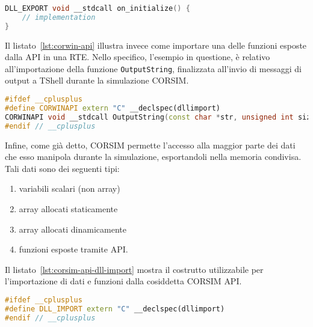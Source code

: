 \vspace*{8pt}\begin{lstlisting}[language=cpp, caption=Esempio di funzione \acs{RTE} esportata, label=lst:callpoint-impl]
DLL_EXPORT void __stdcall on_initialize() {
    // implementation
}
\end{lstlisting}

Il listato~\ref{lst:corwin-api} illustra invece come importare una delle funzioni esposte dalla  \acs{API} in una \acs{RTE}. Nello specifico, l'esempio in questione, è relativo all'importazione della funzione \lstinline[]|OutputString|, finalizzata all'invio di messaggi di output a \acs{TShell} durante la simulazione \acs{CORSIM}.
\vspace*{8pt}\begin{lstlisting}[language=cpp, caption=Importazione delle \acsfont{CORWIN} \acs{API}, label=lst:corwin-api]
#ifdef __cplusplus
#define CORWINAPI extern "C" __declspec(dllimport)
CORWINAPI void __stdcall OutputString(const char *str, unsigned int size, int msgCode, unsigned long color);
#endif // __cplusplus
\end{lstlisting}

Infine, come già detto, \acs{CORSIM} permette l'accesso alla maggior parte dei dati che esso manipola durante la simulazione, esportandoli nella memoria condivisa. Tali dati sono dei seguenti tipi:
\begin{enumerate}
    \item variabili scalari (non array)
    \item array allocati staticamente
    \item array allocati dinamicamente
    \item funzioni esposte tramite \acs{API}.
\end{enumerate}

Il listato~\ref{lst:corsim-api-dll-import} mostra il costrutto utilizzabile per l'importazione di dati e funzioni dalla cosiddetta \acs{CORSIM} \acs{API}.
\vspace*{8pt}\begin{lstlisting}[language=cpp, caption=Costrutto per l'importazione delle \acs{CORSIM} \acs{API}, label=lst:corsim-api-dll-import]
#ifdef __cplusplus
#define DLL_IMPORT extern "C" __declspec(dllimport)
#endif // __cplusplus
\end{lstlisting}

